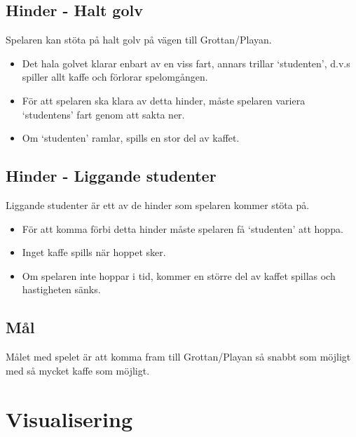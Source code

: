 \documentclass{template}
\begin{document}
\subsection{Hinder - Halt golv}
Spelaren kan stöta på halt golv på vägen till Grottan/Playan. 
\begin{itemize}
\item Det hala golvet klarar enbart av en viss fart, annars trillar `studenten', d.v.s spiller allt kaffe och förlorar spelomgången.
\item För att spelaren ska klara av detta hinder, måste spelaren variera `studentens' fart genom att sakta ner. 
\item Om `studenten' ramlar, spills en stor del av kaffet.
\end{itemize}

\subsection{Hinder - Liggande studenter}
Liggande studenter är ett av de hinder som spelaren kommer stöta på. 
\begin{itemize}
\item För att komma förbi detta hinder måste spelaren få `studenten' att hoppa. 
\item Inget kaffe spills när hoppet sker. 
\item Om spelaren inte hoppar i tid, kommer en större del av kaffet spillas och hastigheten sänks.
\end{itemize}

\subsection{Mål}
Målet med spelet är att komma fram till Grottan/Playan så snabbt som möjligt med så mycket kaffe som möjligt.

\section{Visualisering}
\end{document}
